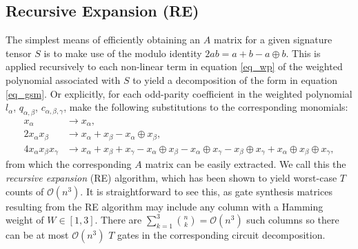 \documentclass[notitlepage]{article}
\theoremstyle{definition}
\theoremstyle{problem}
\theoremstyle{lemma}
\begin{document}
\subsection{Recursive Expansion (RE)}
The simplest means of efficiently obtaining an $A$ matrix for a given signature tensor $S$ is to make use of the modulo identity $2ab = a + b - a\oplus b$. This is applied recursively to each non-linear term in equation \ref{eq_wp} of the weighted polynomial  associated with $S$ to yield a decomposition of the form in equation \ref{eq_gsm}. Or explicitly, for each odd-parity coefficient in the weighted polynomial $l_\alpha$, $q_{\alpha,\beta}$, $c_{\alpha,\beta,\gamma}$, make the following substitutions to the corresponding monomials:
\begin{align}
x_\alpha &\rightarrow x_\alpha, \\
2x_\alpha x_\beta &\rightarrow x_\alpha + x_\beta - x_\alpha \oplus x_\beta, \\
4x_\alpha x_\beta x_\gamma &\rightarrow
x_\alpha + x_\beta  + x_\gamma - x_\alpha \oplus x_\beta - x_\alpha\oplus x_\gamma - x_\beta\oplus x_\gamma + x_\alpha \oplus x_\beta\oplus x_\gamma,
\end{align}
from which the corresponding $A$ matrix can be easily extracted.
We call this the \emph{recursive expansion} (RE) algorithm, which has been shown to yield worst-case $T$ counts of $\mathcal{O}(n^3)$. It is straightforward to see this, as gate synthesis matrices resulting from the RE algorithm may include any column with a Hamming weight of $W\in[1,3]$. There are $\sum_{k=1}^3{{n}\choose{k}}=\mathcal{O}(n^3)$ such columns so there can be at most $\mathcal{O}(n^3)$ $T$ gates in the corresponding circuit decomposition.
\end{document}
